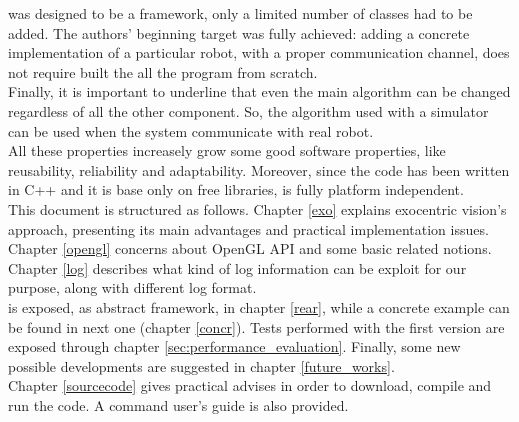 was designed to be a framework, only a limited number of classes
had to be added. The authors' beginning target was fully achieved:
adding a concrete implementation of a particular robot, with a
proper communication channel, does not require built the all
the program from scratch.
\\
Finally, it is important to underline that even the main algorithm
can be changed regardless of all the other component. So, the
algorithm used with a simulator can be used when the system
communicate with real robot.
\\
All these properties increasely grow some good software properties,
like reusability, reliability and adaptability. Moreover,
since the code has been written in C++ and it is base only on
free libraries, \framework{} is fully platform independent.
\\
This document is structured as follows. Chapter \ref{exo} explains
exocentric vision's approach, presenting its main advantages and
practical implementation issues. Chapter \ref{opengl} concerns
about OpenGL API and some basic related notions. Chapter \ref{log}
describes what kind of log information can be exploit for our
purpose, along with different log format.
\\
\framework{} is exposed, as abstract framework, in chapter
\ref{rear}, while a concrete example can be found in next one
(chapter \ref{concr}).
Tests performed with the first \framework{} version are exposed
through chapter \ref{sec:performance_evaluation}. Finally, some new
possible developments are suggested in chapter
\ref{future_works}.
\\
Chapter \ref{sourcecode} gives practical advises
in order to download, compile and run the code. A command user's guide
is also provided.

